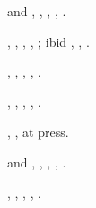 \begin{thebibliography}{7}

	\citeauthor{H.G. Grimm} and \citeauthor{A. Sommerfeld}, , , , \citeyear{1926}.

	\citeauthor{E. Wigner}, , , , \citeyear{1927}; ibid , , \citeyear{1927}.

	\citeauthor{P.A.M. Dirac}, , , , \citeyear{1926}.

	\citeauthor{W. Heitler}, , , , \citeyear{1927}.
	
	\citeauthor{W. Heitler}, , at press.
	
	\citeauthor{W. Heitler} and \citeauthor{F. London}, , , , \citeyear{1927}.
	
	\citeauthor{F. London}, , , , \citeyear{1928 }.
\end{thebibliography}